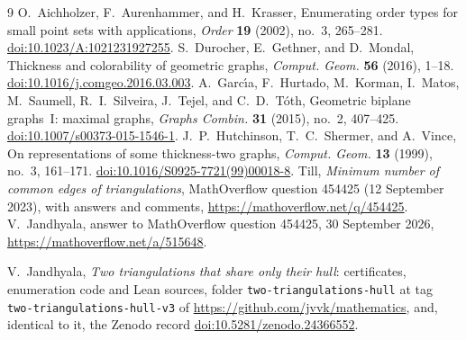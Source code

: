\documentclass[11pt]{amsart}
\theoremstyle{definition}
\newif\ifanon
\begin{document}
\begin{thebibliography}{9}
O.~Aichholzer, F.~Aurenhammer, and H.~Krasser, Enumerating order types for small point sets with applications, \emph{Order} \textbf{19} (2002), no.~3, 265--281. \href{https://doi.org/10.1023/A:1021231927255}{doi:10.1023/A:1021231927255}.
S.~Durocher, E.~Gethner, and D.~Mondal, Thickness and colorability of geometric graphs, \emph{Comput. Geom.} \textbf{56} (2016), 1--18. \href{https://doi.org/10.1016/j.comgeo.2016.03.003}{doi:10.1016/j.comgeo.2016.03.003}.
A.~Garc\'{\i}a, F.~Hurtado, M.~Korman, I.~Matos, M.~Saumell, R.~I.~Silveira, J.~Tejel, and C.~D.~T\'oth, Geometric biplane graphs~I: maximal graphs, \emph{Graphs Combin.} \textbf{31} (2015), no.~2, 407--425. \href{https://doi.org/10.1007/s00373-015-1546-1}{doi:10.1007/s00373-015-1546-1}.
J.~P.~Hutchinson, T.~C.~Shermer, and A.~Vince, On representations of some thickness-two graphs, \emph{Comput. Geom.} \textbf{13} (1999), no.~3, 161--171. \href{https://doi.org/10.1016/S0925-7721(99)00018-8}{doi:10.1016/S0925-7721(99)00018-8}.
Till, \emph{Minimum number of common edges of triangulations}, MathOverflow question 454425 (12 September 2023), with answers and comments, \url{https://mathoverflow.net/q/454425}.
V.~Jandhyala, answer to MathOverflow question 454425, 30 September 2026, \url{https://mathoverflow.net/a/515648}.
\ifanon\else
{}
V.~Jandhyala, \emph{Two triangulations that share only their hull}: certificates, enumeration code and Lean sources, folder \texttt{two-triangulations-hull} at tag \texttt{two-triangulations-hull-v3} of \url{https://github.com/jvvk/mathematics}, and, identical to it, the Zenodo record \href{https://doi.org/10.5281/zenodo.24366552}{doi:10.5281/zenodo.24366552}.
\fi
\end{thebibliography}
\end{document}
